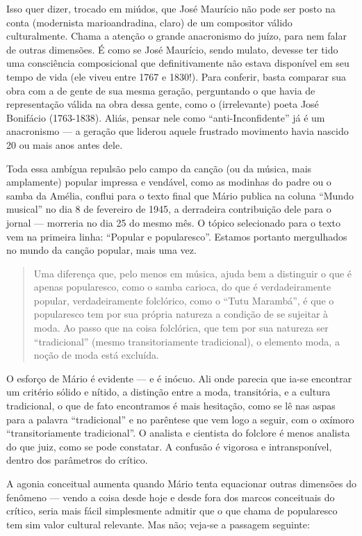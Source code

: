 Isso quer dizer, trocado em miúdos, que José Maurício não pode ser posto
na conta (modernista marioandradina, claro) de um compositor válido
culturalmente. Chama a atenção o grande anacronismo do juízo, para nem
falar de outras dimensões. É como se José Maurício, sendo mulato,
devesse ter tido uma consciência composicional que definitivamente não
estava disponível em seu tempo de vida (ele viveu entre 1767 e 1830!).
Para conferir, basta comparar sua obra com a de gente de sua mesma
geração, perguntando o que havia de representação válida na obra dessa
gente, como o (irrelevante) poeta José Bonifácio (1763-1838). Aliás,
pensar nele como ``anti-Inconfidente'' já é um anacronismo --- a geração
que liderou aquele frustrado movimento havia nascido 20 ou mais anos
antes dele.

Toda essa ambígua repulsão pelo campo da canção (ou da música, mais
amplamente) popular impressa e vendável, como as modinhas do padre ou o
samba da Amélia, conflui para o texto final que Mário publica na coluna
``Mundo musical'' no dia 8 de fevereiro de 1945, a derradeira
contribuição dele para o jornal --- morreria no dia 25 do mesmo mês. O
tópico selecionado para o texto vem na primeira linha: ``Popular e
popularesco''. Estamos portanto mergulhados no mundo da canção popular,
mais uma vez.

\begin{quote}
Uma diferença que, pelo menos em música, ajuda bem a distinguir o que é
apenas popularesco, como o samba carioca, do que é verdadeiramente
popular, verdadeiramente folclórico, como o ``Tutu Marambá'', é que o
popularesco tem por sua própria natureza a condição de se sujeitar à
moda. Ao passo que na coisa folclórica, que tem por sua natureza ser
``tradicional'' (mesmo transitoriamente tradicional), o elemento moda, a
noção de moda está excluída.
\end{quote}

O esforço de Mário é evidente --- e é inócuo. Ali onde parecia que ia-se
encontrar um critério sólido e nítido, a distinção entre a moda,
transitória, e a cultura tradicional, o que de fato encontramos é mais
hesitação, como se lê nas aspas para a palavra ``tradicional'' e no
parêntese que vem logo a seguir, com o oxímoro ``transitoriamente
tradicional''. O analista e cientista do folclore é menos analista do
que juiz, como se pode constatar. A confusão é vigorosa e
intransponível, dentro dos parâmetros do crítico.

A agonia conceitual aumenta quando Mário tenta equacionar outras
dimensões do fenômeno --- vendo a coisa desde hoje e desde fora dos
marcos conceituais do crítico, seria mais fácil simplesmente admitir que
o que chama de popularesco tem sim valor cultural relevante. Mas não;
veja-se a passagem seguinte:

